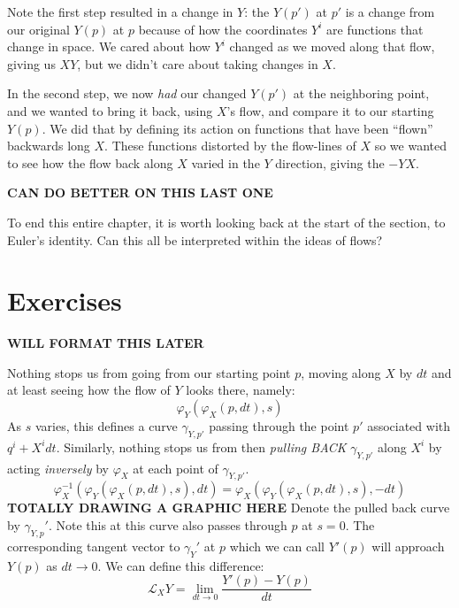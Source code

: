 		Note the first step resulted in a change in $Y$: the $Y(p')$ at $p'$ is a change from our original $Y(p)$ at $p$ because of how the coordinates $Y^i$ are functions that change in space. We cared about how $Y^i$ changed as we moved along that flow, giving us $XY$, but we didn't care about taking changes in $X$. 
		
		In the second step, we now \emph{had} our changed $Y(p')$ at the neighboring point, and we wanted to bring it back, using $X$'s flow, and compare it to our starting $Y(p)$. We did that by defining its action on functions that have been ``flown'' backwards long $X$. These functions distorted by the flow-lines of $X$ so we wanted to see how the flow back along $X$ varied in the $Y$ direction, giving the $-YX$. 
		
		\textbf{CAN DO BETTER ON THIS LAST ONE}
		
		To end this entire chapter, it is worth looking back at the start of the section, to Euler's identity. Can this all be interpreted within the ideas of flows? 
		
	
	\section{Exercises}

	\textbf{WILL FORMAT THIS LATER}

Nothing stops us from going from our starting point $p$, moving along $X$ by $dt$ and at least seeing how the flow of $Y$ looks there, namely:
	\begin{equation}
		\varphi_{Y} (\varphi_{X}(p, dt), s)
	\end{equation}
	As $s$ varies, this defines a curve $\gamma_{Y,p'}$ passing through the point $p'$ associated with $q^i + X^i dt$. Similarly, nothing stops us from then \emph{pulling BACK} $\gamma_{Y,p'}$ along $X^i$ by acting \emph{inversely} by $\varphi_X$ at each point of $\gamma_{Y,p'}$.
	\begin{equation}
		\varphi^{-1}_X (\varphi_Y (\varphi_X(p, dt), s), dt)
		 = \varphi_X (\varphi_Y(\varphi_X(p, dt), s), -dt)
	\end{equation}
	\textbf{TOTALLY DRAWING A GRAPHIC HERE}
	Denote the pulled back curve by $\gamma_{Y,p}'$. Note this at this curve also passes through $p$ at $s=0$. The corresponding tangent vector to $\gamma_Y'$ at $p$ which we can call $Y'(p)$ will approach $Y(p)$ as $dt \rightarrow 0$. We can define this difference:
	\begin{equation}
		\mathcal L_X Y = \lim_{dt \rightarrow 0} \frac{Y'(p) - Y(p)}{dt}
	\end{equation}

